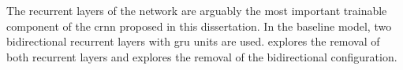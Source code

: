 
The recurrent layers of the network are arguably the most
important trainable component of the \gls{crnn} proposed in
this dissertation. In the baseline model, two bidirectional
recurrent layers with \gls{gru} units are used.
 explores the removal of
both recurrent layers and
 explores the
removal of the bidirectional configuration. 
